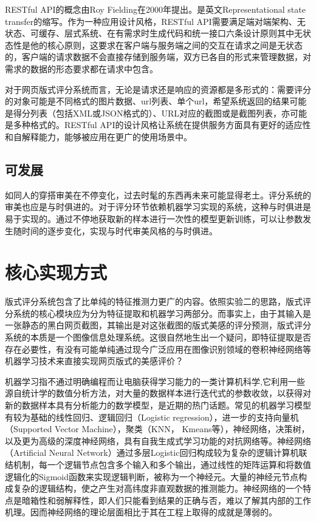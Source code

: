 RESTful API的概念由Roy Fielding在2000年提出。是英文Representational state transfer的缩写。作为一种应用设计风格，RESTful API需要满足端对端架构、无状态、可缓存、层式系统、在有需求时生成代码和统一接口六条设计原则其中无状态性是他的核心原则，这要求在客户端与服务端之间的交互在请求之间是无状态的，客户端的请求数据不会直接存储到服务端，双方已各自的形式来管理数据，对需求的数据的形态要求都在请求中包含。

对于网页版式评分系统而言，无论是请求还是响应的资源都是多形式的：需要评分的对象可能是不同格式的图片数据、url列表、单个url，希望系统返回的结果可能是得分列表（包括XML或JSON格式的）、URL对应的截图或是截图列表，亦可能是多种格式的。RESTful API的设计风格让系统在提供服务方面具有更好的适应性和自解释能力，能够被应用在更广的使用场景中。

\subsection{可发展}
如同人的穿搭审美在不停变化，过去时髦的东西再未来可能显得老土。评分系统的审美也应是与时俱进的。对于评分环节依赖机器学习实现的系统，这种与时俱进是易于实现的。通过不停地获取新的样本进行一次性的模型更新训练，可以让参数发生随时间的逐步变化，实现与时代审美风格的与时俱进。

\section{核心实现方式}
版式评分系统包含了比单纯的特征推测力更广的内容。依照实验二的思路，版式评分系统的核心模块应为分为特征提取和机器学习两部分。而事实上，由于其输入是一张静态的黑白网页截图，其输出是对这张截图的版式美感的评分预测，版式评分系统的本质是一个图像信息处理系统。这很自然地生出一个疑问，即特征提取是否存在必要性，有没有可能单纯通过现今广泛应用在图像识别领域的卷积神经网络等机器学习技术来直接实现网页版式的美感评价？

机器学习指不通过明确编程而让电脑获得学习能力的一类计算机科学\cite{Koza1996},它利用一些源自统计学的数值分析方法，对大量的数据样本进行迭代式的参数收敛，以获得对新的数据样本具有分析能力的数学模型，是近期的热门话题。常见的机器学习模型有较为基础的线性回归、逻辑回归（Logistic regression），进一步的支持向量机（Supported Vector Machine），聚类（KNN， Kmeans等），神经网络，决策树，以及更为高级的深度神经网络，具有自我生成式学习功能的对抗网络等。神经网络（Artificial Neural Network）通过多层Logistic回归构成较为复杂的逻辑计算机联结机制，每一个逻辑节点包含多个输入和多个输出，通过线性的矩阵运算和将数值逻辑化的Sigmoid函数来实现逻辑判断，被称为一个神经元。大量的神经元节点构成复杂的逻辑结构，使之产生对高纬度非直观数据的推测能力。神经网络的一个特点是暗箱性和弱解释性，即人们只能看到结果的正确与否，难以了解其内部的工作机理。因而神经网络的理论层面相比于其在工程上取得的成就是薄弱的。

